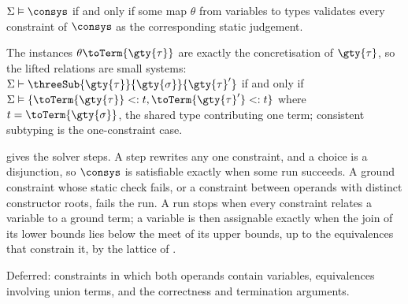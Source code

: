 \begin{definition}[Satisfaction]
\label{def:satisfaction}
$\Sigma \vDash \consys$ if and only if some map $\theta$ from variables to types validates every
constraint of $\consys$ as the corresponding static judgement.
\end{definition}

\noindent The instances $\theta\toTerm{\gty{\tau}}$ are exactly the concretisation of
$\gty{\tau}$, so the lifted relations are small systems:
$\Sigma \vdash \threeSub{\gty{\tau}}{\gty{\sigma}}{\gty{\tau}'}$ if and only if
$\Sigma \vDash \set{\toTerm{\gty{\tau}} \subty t, \toTerm{\gty{\tau}'} \subty t}$ where
$t = \toTerm{\gty{\sigma}}$, the shared type contributing one term; consistent subtyping is the
one-constraint case.

 gives the solver steps. A step rewrites any one constraint, and a
choice is a disjunction, so $\consys$ is satisfiable exactly when some run succeeds. A ground
constraint whose static check fails, or a constraint between operands with distinct constructor
roots, fails the run. A run stops when every constraint relates a variable to a ground term; a
variable is then assignable exactly when the join of its lower bounds lies below the meet of its
upper bounds, up to the equivalences that constrain it, by the lattice of \specification.



Deferred: constraints in which both operands contain variables, equivalences involving union
terms, and the correctness and termination arguments.
